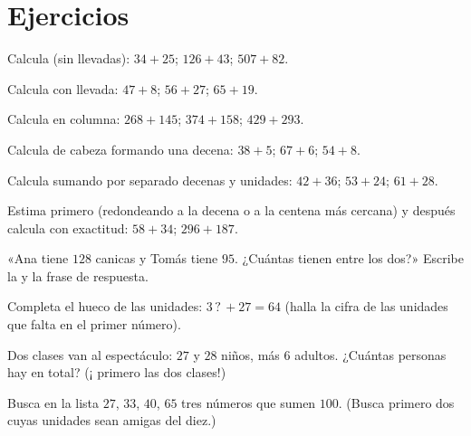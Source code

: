 \section{Ejercicios}

\begin{exercise}[$\star$]\label{exo:g2:addition:1}
Calcula (sin llevadas): $34 + 25$; \quad $126 + 43$; \quad
$507 + 82$.
\end{exercise}

\begin{exercise}[$\star$]\label{exo:g2:addition:2}
Calcula con llevada: $47 + 8$; \quad $56 + 27$; \quad $65 + 19$.
\end{exercise}

\begin{exercise}[$\star$]\label{exo:g2:addition:3}
Calcula en columna: $268 + 145$; \quad $374 + 158$; \quad
$429 + 293$.
\end{exercise}

\begin{exercise}[$\star$]\label{exo:g2:addition:4}
Calcula de cabeza formando una decena: $38 + 5$; \quad $67 + 6$;
\quad $54 + 8$.
\end{exercise}

\begin{exercise}[$\star$]\label{exo:g2:addition:5}
Calcula sumando por separado decenas y unidades: $42 + 36$; \quad
$53 + 24$; \quad $61 + 28$.
\end{exercise}

\begin{exercise}[$\star$]\label{exo:g2:addition:6}
Estima primero (redondeando a la decena o a la centena más cercana) y después
calcula con exactitud: $58 + 34$; \quad $296 + 187$.
\end{exercise}

\begin{exercise}[$\star$]\label{exo:g2:addition:7}
«Ana tiene $128$ canicas y Tomás tiene $95$. ¿Cuántas tienen entre los dos?»
Escribe la  y la frase de respuesta.
\end{exercise}

\begin{exercise}[$\star$]\label{exo:g2:addition:8}
Completa el hueco de las unidades: $3\,?\, + 27 = 64$ (halla la cifra de
las unidades que falta en el primer número).
\end{exercise}

\begin{exercise}[$\star$]\label{exo:g2:addition:9}
Dos clases van al espectáculo: $27$ y $28$ niños, más $6$
adultos. ¿Cuántas personas hay en total? (¡ primero las dos clases!)
\end{exercise}

\begin{exercise}[$\star\star$]\label{exo:g2:addition:10}
Busca en la lista $27$, $33$, $40$, $65$ tres números que sumen
$100$. (Busca primero dos cuyas unidades sean amigas del diez.)
\end{exercise}
